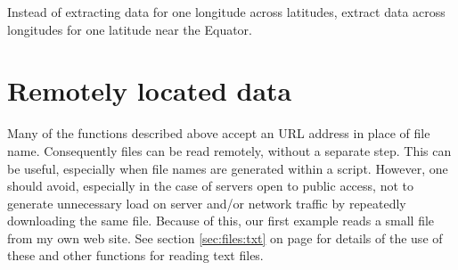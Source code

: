 \documentclass[krantz2]{krantz}\usepackage{knitr}%
\begin{document}
\begin{knitrout}\footnotesize
{}\color{fgcolor}
\end{knitrout}

\begin{playground}
Instead of extracting data for one longitude across latitudes, extract data across longitudes for one latitude near the Equator.
\end{playground}


\section{Remotely located data}\label{sec:files:remote}

Many of the functions described above accept an URL address in place of file name. Consequently files can be read remotely, without a separate step. This can be useful, especially when file names are generated within a script. However, one should avoid, especially in the case of servers open to public access, not to generate unnecessary load on server and/or network traffic by repeatedly downloading the same file. Because of this, our first example reads a small file from my own web site. See section \ref{sec:files:txt} on page \pageref{sec:files:txt} for details of the use of these and other functions for reading text files.
\end{document}
